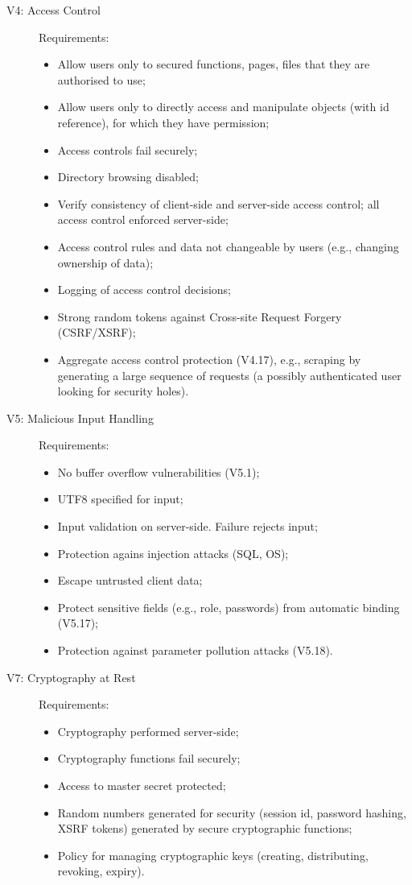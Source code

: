 \documentclass[a4paper]{report}
\begin{document}
\begin{description}
\item[V4: Access Control] Requirements:
\begin{itemize}
\item Allow users only to secured functions, pages, files that they are authorised to use;
\item Allow users only to directly access and manipulate objects (with id reference),
for which they have permission;
\item Access controls fail securely;
\item Directory browsing disabled;
\item Verify consistency of client-side and server-side access control;
all access control enforced server-side;
\item Access control rules and data not changeable by users (e.g., changing ownership of data);
\item Logging of access control decisions;
\item Strong random tokens against Cross-site Request Forgery (CSRF/XSRF);
\item Aggregate access control protection (V4.17), e.g., scraping by generating 
a large sequence of requests (a possibly authenticated user looking for security holes).
\end{itemize}

\item[V5: Malicious Input Handling] Requirements:
\begin{itemize}
\item No buffer overflow vulnerabilities (V5.1);
\item UTF8 specified for input;
\item Input validation on server-side. Failure rejects input;
\item Protection agains injection attacks (SQL, OS);
\item Escape untrusted client data;
\item Protect sensitive fields (e.g., role, passwords) from automatic binding (V5.17);
\item Protection against parameter pollution attacks (V5.18).
\end{itemize}

\item[V7: Cryptography at Rest] Requirements:
\begin{itemize}
\item Cryptography performed server-side;
\item Cryptography functions fail securely;
\item Access to master secret protected;
\item Random numbers generated for security (session id, password hashing,
XSRF tokens) generated by secure cryptographic functions;
\item Policy for managing cryptographic keys (creating, distributing, revoking, expiry).
\end{itemize}


\end{description}
\end{document}
